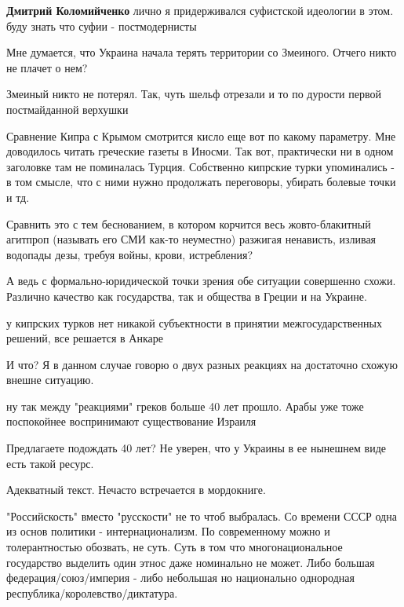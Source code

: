 \begin{itemize}
\begin{itemize}
\textbf{Дмитрий Коломийченко} лично я придерживался суфистской идеологии в этом. буду знать что суфии - постмодернисты

\end{itemize} %


Мне думается, что Украина начала терять территории со Змеиного. Отчего никто не
плачет о нем?

\begin{itemize} %
Змеиный никто не потерял. Так, чуть шельф отрезали и то по дурости первой постмайданной верхушки
\end{itemize} %


Сравнение Кипра с Крымом смотрится кисло еще вот по какому параметру. Мне
доводилось читать греческие газеты в Иносми. Так вот, практически ни в одном
заголовке там не поминалась Турция. Собственно кипрские турки упоминались - в
том смысле, что с ними нужно продолжать переговоры, убирать болевые точки и тд.

Сравнить это с тем беснованием, в котором корчится весь жовто-блакитный
агитпроп (называть его СМИ как-то неуместно) разжигая ненависть, изливая
водопады дезы, требуя войны, крови, истребления?

А ведь с формально-юридической точки зрения обе ситуации совершенно схожи.
Различно качество как государства, так и общества в Греции и на Украине.

\begin{itemize} %
у кипрских турков нет никакой субъектности в принятии межгосударственных решений, все решается в Анкаре

И что? Я в данном случае говорю о двух разных реакциях на достаточно схожую внешне ситуацию.

ну так между "реакциями" греков больше 40 лет прошло. Арабы уже тоже поспокойнее воспринимают существование Израиля

Предлагаете подождать 40 лет?
Не уверен, что у Украины в ее нынешнем виде есть такой ресурс.
\end{itemize} %

Адекватный текст. Нечасто встречается в мордокниге.


"Российскость" вместо "русскости" не то чтоб выбралась. Со времени СССР одна из
основ политики - интернационализм. По современному можно и толерантностью
обозвать, не суть. Суть в том что многонациональное государство выделить один
этнос даже номинально не может. Либо большая федерация/союз/империя - либо
небольшая но национально однородная республика/королевство/диктатура.



\end{itemize}
